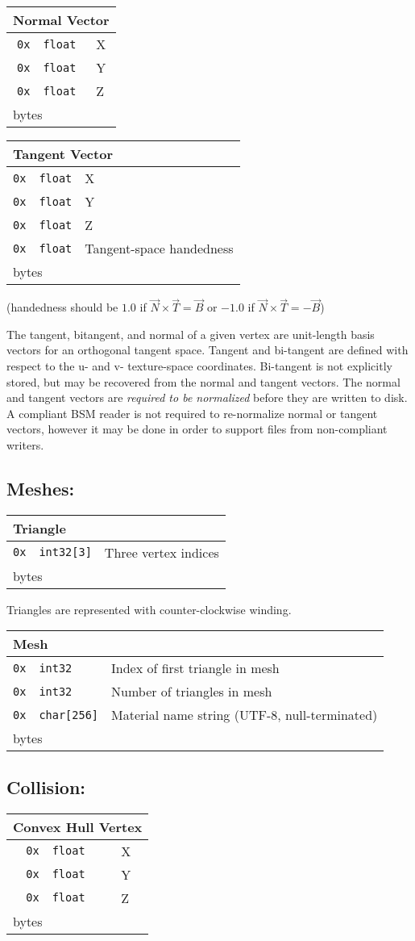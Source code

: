 \documentclass{article}
\newcounter{filebytecounter}
\newenvironment{filestruct}[1]{
	\setcounter{filebytecounter}{0}
	\begin{center}
	\begin{tabular*}{0.85\textwidth}{r|l|l}
	\multicolumn{3}{l}{\textbf{#1}}\\
	\hline
}{
	\hline
	\multicolumn{3}{l}{\decimal{filebytecounter} bytes}\\
	\hline
	\end{tabular*}
	\end{center}
}
\newcommand{\fileitem}[3]{
	\texttt{0x\padzeroes[2]\Hexadecimal{filebytecounter}}\addtocounter{filebytecounter}{#1} & \texttt{#2} & {#3} \\
}
\begin{document}
\begin{filestruct}{Normal Vector}
	\fileitem{4}{float}{X}
	\fileitem{4}{float}{Y}
	\fileitem{4}{float}{Z}
\end{filestruct}

\begin{filestruct}{Tangent Vector}
	\fileitem{4}{float}{X}
	\fileitem{4}{float}{Y}
	\fileitem{4}{float}{Z}
	\fileitem{4}{float}{Tangent-space handedness}
\end{filestruct}
\begin{center}
	(handedness should be $1.0$ if $\vec{N} \times \vec{T} = \vec{B}$ or $-1.0$ if $\vec{N} \times \vec{T} = -\vec{B}$)
\end{center}
\vspace{12pt}
The tangent, bitangent, and normal of a given vertex are unit-length basis vectors for an orthogonal tangent space.  Tangent and bi-tangent are defined with respect to the u- and v- texture-space coordinates.  Bi-tangent is not explicitly stored, but may be recovered from the normal and tangent vectors.  The normal and tangent vectors are \textit{required to be normalized} before they are written to disk.  A compliant BSM reader is not required to re-normalize normal or tangent vectors, however it  may be done in order to support files from non-compliant writers.

\subsection{Meshes:}
\begin{filestruct}{Triangle}
	\fileitem{12}{int32[3]}{Three vertex indices}
\end{filestruct}
Triangles are represented with counter-clockwise winding.

\begin{filestruct}{Mesh}
	\fileitem{4}{int32}{Index of first triangle in mesh}
	\fileitem{4}{int32}{Number of triangles in mesh}
	\fileitem{256}{char[256]}{Material name string (UTF-8, null-terminated)}
\end{filestruct}

\subsection{Collision:}
\begin{filestruct}{Convex Hull Vertex}
	\fileitem{4}{float}{X}
	\fileitem{4}{float}{Y}
	\fileitem{4}{float}{Z}
\end{filestruct}
\end{document}

